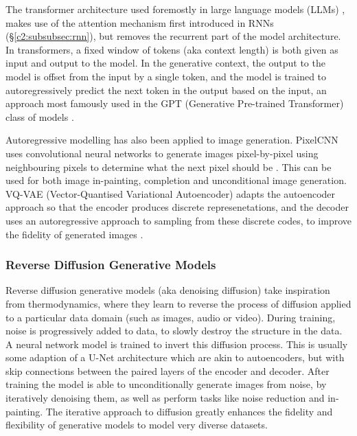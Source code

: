 The transformer architecture used foremostly in large language models (LLMs) \citep{vaswani2017attention}, makes use of the attention mechanism first introduced in RNNs \citep{bahdanau2014neural} (\S \ref{c2:subsubsec:rnn}), but removes the recurrent part of the model architecture.
In transformers, a fixed window of tokens (aka context length) is both given as input and output to the model.
In the generative context, the output to the model is offset from the input by a single token, and the model is trained to autoregressively predict the next token in the output based on the input, an approach most famously used in the GPT (Generative Pre-trained Transformer) class of models \citep{radford2018improving, radford2019language,brown2020language}.

Autoregressive modelling has also been applied to image generation.
PixelCNN uses convolutional neural networks to generate images pixel-by-pixel using neighbouring pixels to determine what the next pixel should be \citep{van2016conditional}.
This can be used for both image in-painting, completion and unconditional image generation.
VQ-VAE (Vector-Quantised Variational Autoencoder) adapts the autoencoder approach so that the encoder produces discrete represenetations, and the decoder uses an autoregressive approach to sampling from these discrete codes, to improve the fidelity of generated images \citep{van2017neural}. 

\subsubsection{Reverse Diffusion Generative Models}
\label{c2:subsubsec:diffusion}

Reverse diffusion generative models (aka denoising diffusion) take inspiration from thermodynamics, where they learn to reverse the process of diffusion applied to a particular data domain \citep{sohl2015deep} (such as images, audio or video). 
During training, noise is progressively added to data, to slowly destroy the structure in the data.
A neural network model is trained to invert this diffusion process. This is usually some adaption of a U-Net architecture \citep{ronneberger2015u} which are akin to autoencoders, but with skip connections between the paired layers of the encoder and decoder.
After training the model is able to unconditionally generate images from noise, by iteratively denoising them, as well as perform tasks like noise reduction and in-painting. 
The iterative approach to diffusion greatly enhances the fidelity and flexibility of generative models to model very diverse datasets.

